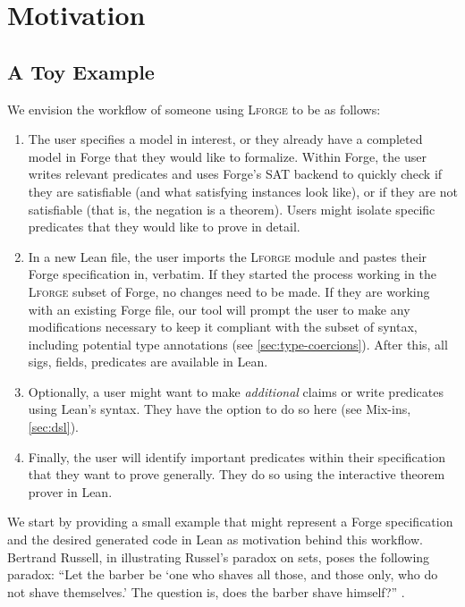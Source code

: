 \section{Motivation}


\subsection{A Toy Example}\label{sec:toy-example}

We envision the workflow of someone using \textsc{Lforge} to be as follows: 
\begin{enumerate}
    \item The user specifies a model in interest, or they already have a completed model in Forge that they would like to formalize. Within Forge, the user writes relevant predicates and uses Forge's SAT backend to quickly check if they are satisfiable (and what satisfying instances look like), or if they are not satisfiable (that is, the negation is a theorem). Users might isolate specific predicates that they would like to prove in detail. 
    \item In a new Lean file, the user imports the \textsc{Lforge} module and pastes their Forge specification in, verbatim. If they started the process working in the \textsc{Lforge} subset of Forge, no changes need to be made. If they are working with an existing Forge file, our tool will prompt the user to make any modifications necessary to keep it compliant with the subset of syntax, including potential type annotations (see \cref{sec:type-coercions}). After this, all sigs, fields, predicates are available in Lean. 
    \item Optionally, a user might want to make \emph{additional} claims or write predicates using Lean's syntax. They have the option to do so here (see Mix-ins, \cref{sec:dsl}). 
    \item Finally, the user will identify important predicates within their specification that they want to prove generally. They do so using the interactive theorem prover in Lean. 
\end{enumerate}

We start by providing a small example that might represent a Forge specification and the desired generated code in Lean as motivation behind this workflow. Bertrand Russell, in illustrating Russel's paradox on sets, poses the following paradox: ``Let the barber be `one who shaves all those, and those only, who do not shave themselves.' The question is, does the barber shave himself?'' \cite[101]{russell2009philosophy}. 

